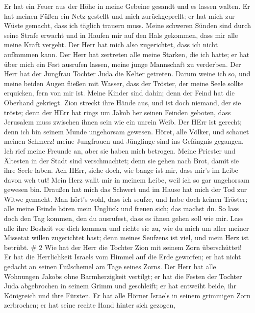  Er hat ein Feuer aus der Höhe in meine Gebeine gesandt und
es lassen walten. Er hat meinen Füßen ein Netz gestellt und mich
zurückgeprellt; er hat mich zur Wüste gemacht, dass ich täglich trauern
muss.  Meine schweren Sünden sind durch seine Strafe
erwacht und in Haufen mir auf den Hals gekommen, dass mir alle meine
Kraft vergeht. Der Herr hat mich also zugerichtet, dass ich nicht
aufkommen kann.  Der Herr hat zertreten alle meine Starken,
die ich hatte; er hat über mich ein Fest ausrufen lassen, meine junge
Mannschaft zu verderben. Der Herr hat der Jungfrau Tochter Juda die
Kelter getreten.  Darum weine ich so, und meine beiden
Augen fließen mit Wasser, dass der Tröster, der meine Seele sollte
erquicken, fern von mir ist. Meine Kinder sind dahin; denn der Feind hat
die Oberhand gekriegt.  Zion streckt ihre Hände aus, und
ist doch niemand, der sie tröste; denn der HErr hat rings um Jakob her
seinen Feinden geboten, dass Jerusalem muss zwischen ihnen sein wie ein
unrein Weib.  Der HErr ist gerecht; denn ich bin seinem
Munde ungehorsam gewesen. Höret, alle Völker, und schauet meinen
Schmerz! meine Jungfrauen und Jünglinge sind ins Gefängnis gegangen.
 Ich rief meine Freunde an, aber sie haben mich betrogen.
Meine Priester und Ältesten in der Stadt sind verschmachtet; denn sie
gehen nach Brot, damit sie ihre Seele laben.  Ach HErr,
siehe doch, wie bange ist mir, dass mir's im Leibe davon weh tut! Mein
Herz wallt mir in meinem Leibe, weil ich so gar ungehorsam gewesen bin.
Draußen hat mich das Schwert und im Hause hat mich der Tod zur Witwe
gemacht.  Man hört's wohl, dass ich seufze, und habe doch
keinen Tröster; alle meine Feinde hören mein Unglück und freuen sich;
das machst du. So lass doch den Tag kommen, den du ausrufest, dass es
ihnen gehen soll wie mir.  Lass alle ihre Bosheit vor dich
kommen und richte sie zu, wie du mich um aller meiner Missetat willen
zugerichtet hast; denn meines Seufzens ist viel, und mein Herz ist
betrübt. \# 2  Wie hat der Herr die Tochter Zion mit seinem
Zorn überschüttet! Er hat die Herrlichkeit Israels vom Himmel auf die
Erde geworfen; er hat nicht gedacht an seinen Fußschemel am Tage seines
Zorns.  Der Herr hat alle Wohnungen Jakobs ohne
Barmherzigkeit vertilgt; er hat die Festen der Tochter Juda abgebrochen
in seinem Grimm und geschleift; er hat entweiht beide, ihr Königreich
und ihre Fürsten.  Er hat alle Hörner Israels in seinem
grimmigen Zorn zerbrochen; er hat seine rechte Hand hinter sich gezogen,
